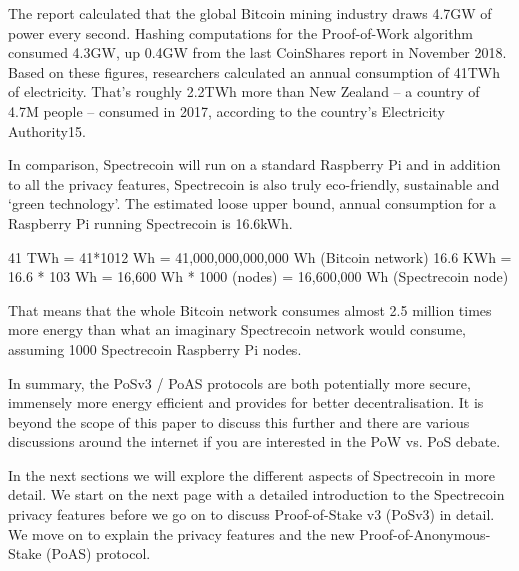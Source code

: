 The report calculated that the global Bitcoin mining industry draws 4.7GW of
power every second. Hashing computations for the Proof-of-Work algorithm
consumed 4.3GW, up 0.4GW from the last CoinShares report in November 2018.
Based on these figures, researchers calculated an annual consumption of
41TWh of electricity. That’s roughly 2.2TWh more than New Zealand – a country
of 4.7M people – consumed in 2017, according to the country’s Electricity
Authority15.



In comparison, Spectrecoin will run on a standard Raspberry Pi and in addition
to all the privacy features, Spectrecoin is also truly eco-friendly, sustainable
and ‘green technology’. The estimated loose upper bound, annual consumption for
a Raspberry Pi running Spectrecoin is 16.6kWh.



41 TWh = 41*1012 Wh = 41,000,000,000,000 Wh (Bitcoin network) 16.6 KWh = 16.6 * 103 Wh = 16,600 Wh * 1000 (nodes) = 16,600,000 Wh (Spectrecoin node)



That means that the whole Bitcoin network consumes almost 2.5 million times
more energy than what an imaginary Spectrecoin network would consume, assuming
1000 Spectrecoin Raspberry Pi nodes.




In summary, the PoSv3 / PoAS protocols are both potentially more secure,
immensely more energy efficient and provides for better decentralisation.
It is beyond the scope of this paper to discuss this further and there are
various discussions around the internet if you are interested in the PoW vs.
PoS debate.



In the next sections we will explore the different aspects of Spectrecoin in
more detail. We start on the next page with a detailed introduction to the
Spectrecoin privacy features before we go on to discuss Proof-of-Stake v3
(PoSv3) in detail. We move on to explain the privacy features and the new
Proof-of-Anonymous-Stake (PoAS) protocol.